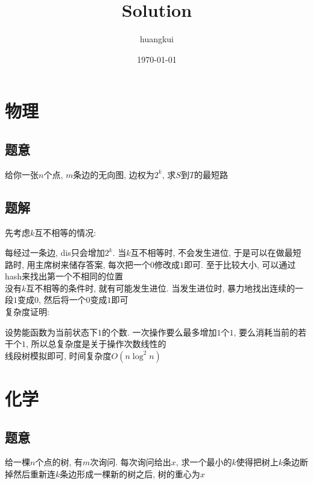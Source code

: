 \documentclass[12pt]{ctexart}
\begin{document}
\pagestyle{fancy}
\renewcommand{\headrulewidth}{0.4pt}
\date{\today}
\author{huangkui}
\title{Solution}

\begin{spacing}{1.2}
    \maketitle

	\newpage

	\section{物理}
	
	\subsection{题意}
	给你一张$n$个点, $m$条边的无向图, 边权为$2^k$, 求$S$到$T$的最短路

	\subsection{题解}

	先考虑$k$互不相等的情况: 

	每经过一条边, dis只会增加$2^k$. 当$k$互不相等时, 不会发生进位, 于是可以在做最短路时, 用主席树来储存答案, 每次把一个$0$修改成$1$即可. 至于比较大小, 可以通过hash来找出第一个不相同的位置
	\\


	没有$k$互不相等的条件时, 就有可能发生进位. 当发生进位时, 暴力地找出连续的一段$1$变成$0$, 然后将一个$0$变成$1$即可
	\\

	复杂度证明:  

	设势能函数为当前状态下$1$的个数. 一次操作要么最多增加$1$个$1$, 要么消耗当前的若干个$1$, 所以总复杂度是关于操作次数线性的
	\\

	线段树模拟即可, 时间复杂度$O(n\log^2 n)$

	\newpage

	\section{化学}

	\subsection{题意}
	给一棵$n$个点的树, 有$m$次询问. 每次询问给出$x$, 求一个最小的$k$使得把树上$k$条边断掉然后重新连$k$条边形成一棵新的树之后, 树的重心为$x$


\end{spacing}
\end{document}
